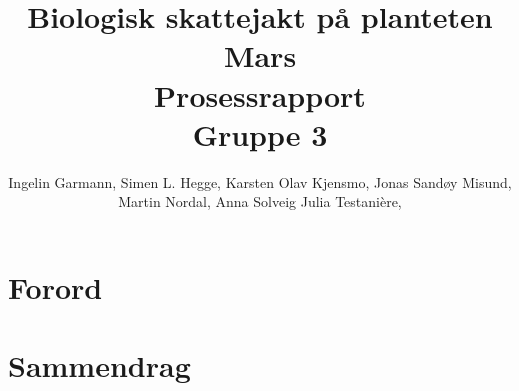 \documentclass[DIV=calc, paper=a4, fontsize=12pt]{scrartcl}	 %
\title{Biologisk skattejakt på planteten Mars \\ Prosessrapport \\ Gruppe 3} %
\author{Ingelin Garmann, Simen L. Hegge, Karsten Olav Kjensmo, Jonas Sandøy Misund, Martin Nordal, Anna Solveig Julia Testani\`{e}re, } %
\date{} %
\begin{document}
\maketitle %

\thispagestyle{fancy} %




\section*{Forord}



\begin{multicols}{2}


\end{multicols}


\section*{Sammendrag}

\begin{multicols}{2}

\end{multicols}


\pagebreak
\renewcommand{\contentsname}%
	{Innhold}

\tableofcontents


\pagebreak


\end{document}
